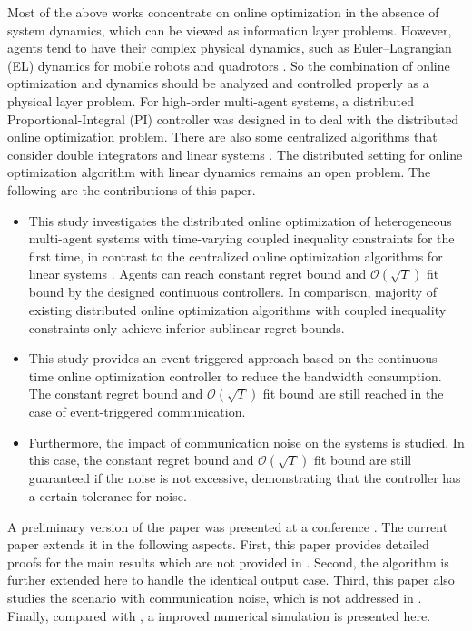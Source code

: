 \documentclass[final,5p,times,twocolumn,authoryear]{elsarticle}
\begin{document}
	
	Most of the above works concentrate on online optimization in the absence of system dynamics, which can be viewed as information layer problems. However, agents tend to have their complex physical dynamics, such as Euler–Lagrangian (EL) dynamics for mobile robots and quadrotors \citep{ ray2021}. So the combination of online optimization and dynamics should be analyzed and controlled properly as a physical layer problem. 
	For high-order multi-agent systems, a distributed Proportional-Integral (PI) controller was designed in \citet{deng2016}  to deal with the distributed online optimization problem. There are also some centralized algorithms that consider double integrators \citep{ll2021} and linear systems \citep{col2020,non2021}.
	The distributed setting for online optimization algorithm with linear dynamics remains an open problem.
	The following are the contributions of this paper.
	\begin{itemize}
		\item This study investigates the distributed online optimization of heterogeneous multi-agent systems with time-varying coupled inequality constraints for the first time, in contrast to the centralized online optimization algorithms for linear systems \citep{col2020,non2021}. 
		Agents can reach constant regret bound and $\mathcal{O}(\sqrt{T})$ fit bound by  the designed continuous controllers. In comparison, majority of existing distributed online optimization algorithms \citep{yi2020,li2022} with coupled inequality constraints only achieve inferior sublinear regret bounds.
		
		\item This study provides an event-triggered approach based on the continuous-time online optimization controller  to reduce the bandwidth consumption. The constant regret bound and $\mathcal{O}(\sqrt{T})$ fit bound are still reached in the case of event-triggered communication.
		\item Furthermore, the impact of communication noise on the systems is studied. In this case, the constant regret bound and $\mathcal{O}(\sqrt{T})$ fit bound are still guaranteed if the noise is not excessive, demonstrating that the  controller has a certain tolerance for noise.
	\end{itemize}
	
	A preliminary version of the paper was presented at a conference \citep{yy2022b}. The current paper extends it in the following aspects. First, this paper provides detailed proofs for the main results which are not provided in \citet{yy2022b}.  Second, the algorithm is further extended here to handle the identical output case. Third, this paper also studies the scenario with communication noise, which is not addressed in \citet{yy2022b}. Finally, compared with \citet{yy2022b}, 
	 a improved numerical simulation is presented here.
	
\end{document}
